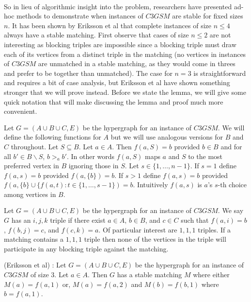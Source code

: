 \paragraph{}
So in lieu of algorithmic insight into the problem, researchers have presented ad-hoc methods to demonstrate when instances of $C3GSM$ are stable for fixed sizes $n$. It has been shown by Eriksson et al \cite{eriksson2006three} that complete instances of size $n \leq 4$ always have a stable matching. First observe that cases of size $n \leq 2$ are not interesting as blocking triples are impossible since a blocking triple must draw each of its vertices from a distinct triple in the matching (no vertices in instances of $C3GSM$ are unmatched in a stable matching, as they would come in threes and prefer to be together than unmatched). The case for $n=3$ is straightforward and requires a bit of case analysis, but Eriksson et al have shown something stronger that we will prove instead. Before we state the lemma, we will give some quick notation that will make discussing the lemma and proof much more convenient.
\begin{definition}
Let $G=(A\cup B \cup C, E)$ be the hypergraph for an instance of $C3GSM$. We will define the following functions for $A$ but we will use analogous versions for $B$ and $C$ throughout. Let $S\subseteq B$. Let $a \in A$. Then $f(a, S) = b$ provided $b \in B$ and for all $b' \in B \backslash S$, $b>_a b'$. In other words $f(a,S)$ maps $a$ and $S$ to the most preferred vertex in $B$ ignoring those in $S$. Let $s \in \{1,\dots,n-1\}$. If $s=1$ define $f(a,s) = b$ provided $f(a,\{b\}) = b$. If $s>1$ define $f(a,s) = b$ provided $f(a,\{b\}\cup\{f(a,t): t\in\{1,\dots,s-1\}) = b$. Intuitively $f(a,s)$ is $a$'s $s$-th choice among vertices in $B$.
\end{definition}
\begin{definition}
Let $G = (A \cup B \cup C, E)$ be the hypergraph for an instance of $C3GSM$. We say $G$ has an $i,j,k$ triple if there exist $a \in A$, $b\in B$, and $c \in C$ such that $f(a,i) = b$, $f(b,j) = c$, and $f(c,k) = a$. Of particular interest are $1,1,1$ triples. If a matching contains a $1,1,1$ triple then none of the vertices in the triple will participate in any blocking triple against the matching.
\end{definition}
\begin{lemma}\label{lemma:n3}
(Eriksson et al) \cite{eriksson2006three}: Let $G=(A\cup B \cup C, E)$ be the hypergraph for an instance of $C3GSM$ of size $3$. Let $a \in A$. Then $G$ has a stable matching $M$ where either $M(a)= f(a,1)$ or, $M(a) = f(a,2)$ and $M(b) = f(b,1)$ where $b = f(a,1)$.
\end{lemma}
